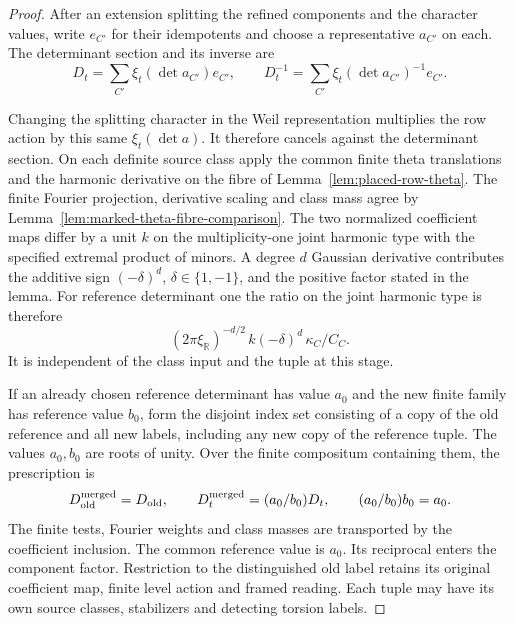 \begin{proof}
After an extension splitting the refined components and the
character values, write \(e_{C'}\) for their idempotents and
choose a representative \(a_{C'}\) on each. The determinant
section and its inverse are
\[
 D_t=\sum_{C'}\xi_t(\det a_{C'})e_{C'},\qquad
 D_t^{-1}=\sum_{C'}\xi_t(\det a_{C'})^{-1}e_{C'} .
\]

Changing the splitting character in the Weil representation
multiplies the row action by this same \(\xi_t(\det a)\).
It therefore cancels against the determinant section. On each
definite source class apply the common finite theta translations
and the harmonic derivative on the fibre of
Lemma~\ref{lem:placed-row-theta}. The finite Fourier projection,
derivative scaling and class mass agree by
Lemma~\ref{lem:marked-theta-fibre-comparison}. The two normalized
coefficient maps differ by a unit \(k\) on the multiplicity-one
joint harmonic type with the specified extremal product of minors.
A degree \(d\) Gaussian derivative contributes the additive
sign \((-\delta)^d\), \(\delta\in\{1,-1\}\), and the positive
factor stated in the lemma. For reference determinant one the
ratio on the joint harmonic type is therefore
\[
     (2\pi\xi_{\mathbb R})^{-d/2}\,
          k(-\delta)^d\,\kappa_C/C_C .
\]
It is independent of the class input and the tuple at this stage.

If an already chosen reference determinant has value \(a_0\)
and the new finite family has reference value \(b_0\), form the
disjoint index set consisting of a copy of the old reference and
all new labels, including any new copy of the reference tuple.
The values \(a_0,b_0\) are roots of unity. Over the finite
compositum containing them, the prescription is
\[
 D^{\rm merged}_{\rm old}=D_{\rm old},\qquad
 D^{\rm merged}_t=(a_0/b_0)D_t,\qquad (a_0/b_0)b_0=a_0 .
\]
The finite tests, Fourier weights and class masses are transported
by the coefficient inclusion. The common reference value is \(a_0\).
Its reciprocal enters the component factor. Restriction to the
distinguished old label retains its original coefficient map,
finite level action and framed reading. Each tuple may have its
own source classes, stabilizers and detecting torsion labels.
\end{proof}


